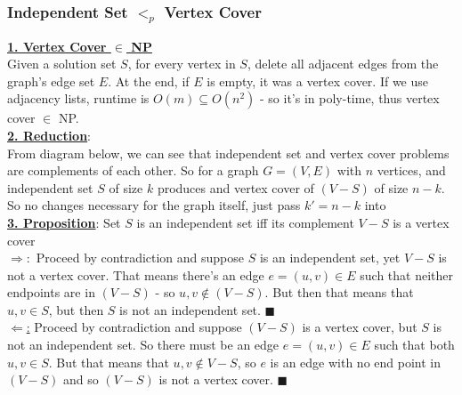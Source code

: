 \subsubsection*{Independent Set $<_p $ Vertex Cover}
\ul{\textbf{1. Vertex Cover $\in$ NP}} \\
Given a solution set $S$, for every vertex in $S$, delete all adjacent edges from the graph's edge set $E$. At the end, if $E$ is empty, it was a vertex cover. If we use adjacency lists, runtime is $O(m) \subseteq O(n^2)$ - \medskip so it's in poly-time, thus vertex cover $\in$ NP. \\
\ul{\textbf{2. Reduction}}: \\
From diagram below, we can see that independent set and vertex cover problems are complements of each other. So for a graph $G = (V,E)$ with $n$ vertices, and independent set $S$ of size $k$ produces and vertex cover of $(V - S)$ of size $n - k$. So no changes necessary \medskip for the graph itself, just pass $k' = n - k$ into \\
\ul{\textbf{3. Proposition}}: Set $S$ is an independent set iff its complement $V - S$ is a vertex cover\\
\ul{$\Longrightarrow:$} Proceed by contradiction and suppose $S$ is an independent set, yet $V -S$ is not a vertex cover. That means there's an edge $e = (u,v) \in E$  such that neither endpoints are in $(V-S)$ - so $u,v \not \in (V-S)$. But then that means that $u, v \in S$, but then $S$ is not an independent set. $\blacksquare$ \\
\ul{$\Longleftarrow$:} Proceed by contradiction and suppose $(V-S)$ is a vertex cover, but $S$ is not an independent set. So there must be an edge $e = (u,v) \in E$ such that both $u,v \in S$. But that means that $u, v \not \in V-S$, so $e$ is an edge with no end point in $(V-S)$ and so $(V-S)$ is not a vertex cover. $\blacksquare$


